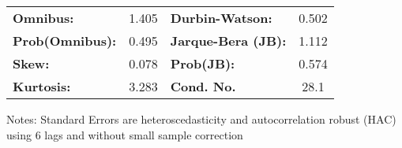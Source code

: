 \begin{center}
\begin{tabular}{lcccccc}
\bottomrule
\end{tabular}
\begin{tabular}{lclc}
\textbf{Omnibus:}       &  1.405 & \textbf{  Durbin-Watson:     } &    0.502  \\
\textbf{Prob(Omnibus):} &  0.495 & \textbf{  Jarque-Bera (JB):  } &    1.112  \\
\textbf{Skew:}          &  0.078 & \textbf{  Prob(JB):          } &    0.574  \\
\textbf{Kurtosis:}      &  3.283 & \textbf{  Cond. No.          } &     28.1  \\
\bottomrule
\end{tabular}
\end{center}

Notes: \newline
 [1] Standard Errors are heteroscedasticity and autocorrelation robust (HAC) using 6 lags and without small sample correction
